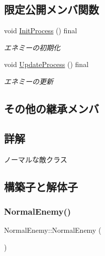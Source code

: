 \subsection*{限定公開メンバ関数}
\begin{DoxyCompactItemize}
\item 
void \mbox{\hyperlink{class_normal_enemy_ae45bd9535595f810d065b92f8dd63342}{Init\+Process}} () final
\begin{DoxyCompactList}\small\item\em エネミーの初期化 \end{DoxyCompactList}\item 
void \mbox{\hyperlink{class_normal_enemy_a371a6bef4feaeb0b47e1ab61dead7b77}{Update\+Process}} () final
\begin{DoxyCompactList}\small\item\em エネミーの更新 \end{DoxyCompactList}\end{DoxyCompactItemize}
\subsection*{その他の継承メンバ}


\subsection{詳解}
ノーマルな敵クラス 

\subsection{構築子と解体子}
\mbox{\label{class_normal_enemy_aa386eea59a2983574fe7d55a91f93012}} 
\subsubsection{\texorpdfstring{Normal\+Enemy()}{NormalEnemy()}\hspace{0.1cm}{\footnotesize\ttfamily [1/3]}}
{\footnotesize\ttfamily Normal\+Enemy\+::\+Normal\+Enemy (\begin{DoxyParamCaption}{ }\end{DoxyParamCaption})\hspace{0.3cm}{\ttfamily [inline]}}



